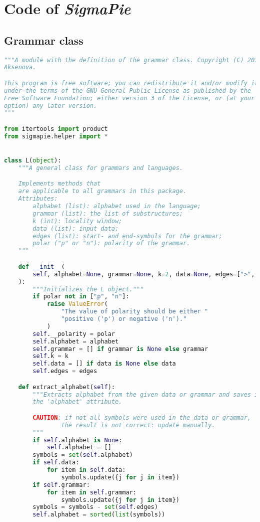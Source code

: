 \newpage
\chapter{Code of \emph{SigmaPie}}

\section{Grammar class}

\begin{lstlisting}[language=Python]
"""A module with the definition of the grammar class. Copyright (C) 2019  Alena
Aksenova.

This program is free software; you can redistribute it and/or modify it
under the terms of the GNU General Public License as published by the
Free Software Foundation; either version 3 of the License, or (at your
option) any later version.
"""

from itertools import product
from sigmapie.helper import *


class L(object):
    """A general class for grammars and languages.

    Implements methods that
    are applicable to all grammars in this package.
    Attributes:
        alphabet (list): alphabet used in the language;
        grammar (list): the list of substructures;
        k (int): locality window;
        data (list): input data;
        edges (list): start- and end-symbols for the grammar;
        polar ("p" or "n"): polarity of the grammar.
    """

    def __init__(
        self, alphabet=None, grammar=None, k=2, data=None, edges=[">", "<"], polar="p"
    ):
        """Initializes the L object."""
        if polar not in ["p", "n"]:
            raise ValueError(
                "The value of polarity should be either "
                "positive ('p') or negative ('n')."
            )
        self.__polarity = polar
        self.alphabet = alphabet
        self.grammar = [] if grammar is None else grammar
        self.k = k
        self.data = [] if data is None else data
        self.edges = edges

    def extract_alphabet(self):
        """Extracts alphabet from the given data or grammar and saves it into
        the 'alphabet' attribute.

        CAUTION: if not all symbols were used in the data or grammar,
                the result is not correct: update manually.
        """
        if self.alphabet is None:
            self.alphabet = []
        symbols = set(self.alphabet)
        if self.data:
            for item in self.data:
                symbols.update({j for j in item})
        if self.grammar:
            for item in self.grammar:
                symbols.update({j for j in item})
        symbols = symbols - set(self.edges)
        self.alphabet = sorted(list(symbols))


\end{lstlisting}
